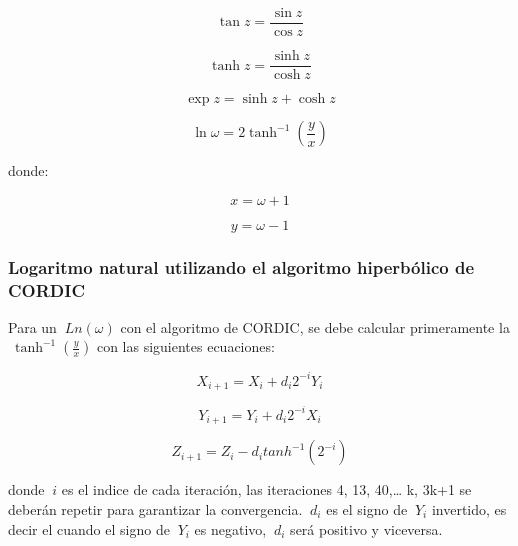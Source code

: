 \begin{equation} \label{eq:ej17}
  \tan z = \frac{\sin z}{\cos z}
\end{equation}

\begin{equation} \label{eq:ej18}
  \tanh z = \frac{\sinh z}{\cosh z}
\end{equation}

\begin{equation} \label{eq:ej19}
  \exp z = \sinh z + \cosh z
\end{equation}

\begin{equation} \label{eq:ej20}
  \ln \omega = 2 \tanh^{-1} \left( \frac{y}{x} \right)
\end{equation}

donde: 

\begin{equation} \label{eq:ej21}
  x = \omega + 1
\end{equation}

\begin{equation} \label{eq:ej22}
  y = \omega - 1
\end{equation}

\subsubsection{Logaritmo natural utilizando el algoritmo hiperbólico de CORDIC}
Para un $\ Ln \left(\omega\right) $  con el algoritmo de CORDIC, se debe calcular primeramente la $\ \tanh^{-1} \left( \frac{y}{x} \right)$ con las siguientes ecuaciones:

 
\begin{equation} \label{eq:ej23}
  X_{i+1} = X_{i} + d_{i} 2^{-i} Y_{i}  
\end{equation}

\begin{equation} \label{eq:ej24}
  Y_{i+1} = Y_{i} + d_{i} 2^{-i} X_{i}  
\end{equation}

\begin{equation} \label{eq:ej25}
  Z_{i+1} = Z_{i} - d_{i} tanh^{-1}\left(2^{-i}\right)
\end{equation}

donde $\ i $ es el indice de cada iteración, las iteraciones 4, 13, 40,… k, 3k+1 se deberán repetir para garantizar la convergencia. $\ d_i $ es el signo de $\ Y_i $ invertido, es decir el cuando el signo de $\ Y_i $ es negativo, $\ d_i $ será positivo y viceversa.

